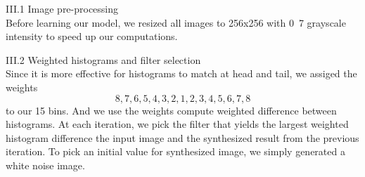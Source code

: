 \documentclass[12pt]{article}
\newenvironment{problem}[2][Part]{\begin{trivlist}
\item[\hskip \labelsep {\bfseries #1}\hskip \labelsep {\bfseries #2}]}{\end{trivlist}}
\begin{document}
\begin{problem}{III Methods}
\item{III.1 Image pre-processing\\}
Before learning our model, we resized all images to 256x256 with 0~7 grayscale intensity to speed up our computations.
\item{III.2 Weighted histograms and filter selection\\}
Since it is more effective for histograms to match at head and tail, we assiged the weights \[8, 7, 6, 5, 4, 3, 2, 1, 2, 3, 4, 5, 6, 7, 8\] to our 15 bins. And we use the weights compute weighted difference between histograms. At each iteration, we pick the filter that yields the largest weighted histogram difference the input image and the synthesized result from the previous iteration. To pick an initial value for synthesized image, we simply generated a white noise image.
\end{problem}
 
\end{document}
